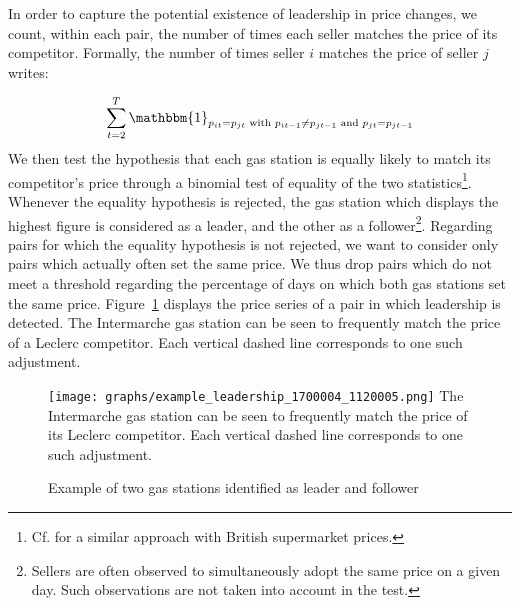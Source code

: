 \documentclass[english]{article}
\begin{document}
In order to capture the potential existence of leadership in price changes, we count, within each pair, the number of times each seller matches the price of its competitor. Formally, the number of times seller $i$ matches the price of seller $j$ writes:

\begin{align*}
\sum_{t=2}^{T}\mathbbm{1}_{p_{it} = p_{jt} \text{ with } p_{it-1} \neq p_{jt-1} \text{ and } p_{jt} = p_{jt-1}}
\end{align*}
We then test the hypothesis that each gas station is equally likely to match its competitor's price through a binomial test of equality of the two statistics\footnote{Cf. \cite{SEA13} for a similar approach with British supermarket prices.}. Whenever the equality hypothesis is rejected, the gas station which displays the highest figure is considered as a leader, and the other as a follower\footnote{Sellers are often observed to simultaneously adopt the same price on a given day. Such observations are not taken into account in the test.}. Regarding pairs for which the equality hypothesis is not rejected, we want to consider only pairs which actually often set the same price. We thus drop pairs which do not meet a threshold regarding the percentage of days on which both gas stations set the same price. Figure~\ref{fig:leader_pair_example} displays the price series of a pair in which leadership is detected. The Intermarche gas station can be seen to frequently match the price of a Leclerc competitor. Each vertical dashed line corresponds to one such adjustment.

\begin{figure}[htb!]
    \caption{Example of two gas stations identified as leader and follower}
	\centering
		\texttt{[image: graphs/example\_leadership\_1700004\_1120005.png]}
\label{fig:leader_pair_example}
\flushleft
\small
The Intermarche gas station can be seen to frequently match the price of its Leclerc competitor. Each vertical dashed line corresponds to one such adjustment.
\end{figure}
\end{document}
